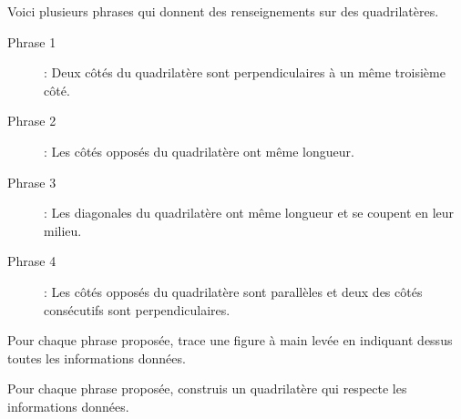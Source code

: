 Voici plusieurs phrases qui donnent des renseignements sur des quadrilatères.
\begin{description}
\item[Phrase 1] : Deux côtés du quadrilatère sont perpendiculaires à un même troisième côté.
\item[Phrase 2] : Les côtés opposés du quadrilatère ont même longueur.
\item[Phrase 3] : Les diagonales du quadrilatère ont même longueur et se coupent en leur milieu.
\item[Phrase 4] : Les côtés opposés du quadrilatère sont parallèles et deux des côtés consécutifs sont perpendiculaires.
\end{description}
\begin{myenumerate}
\item Pour chaque phrase proposée, trace une figure à main levée en indiquant dessus toutes les informations données.
\item Pour chaque phrase proposée, construis un quadrilatère qui respecte les informations données.
\end{myenumerate}
